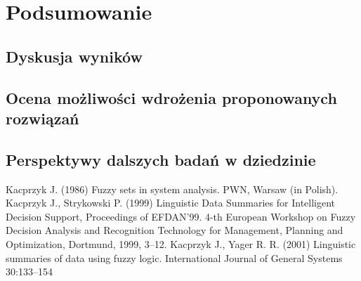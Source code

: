 \chapter{Podsumowanie}
\section{Dyskusja wyników}
\section{Ocena możliwości wdrożenia proponowanych rozwiązań}
\section{Perspektywy dalszych badań w dziedzinie}

\begin{thebibliography}{99}
Kacprzyk J. (1986) Fuzzy sets in system analysis.  PWN, Warsaw (in Polish).
Kacprzyk J., Strykowski P. (1999) Linguistic Data Summaries for Intelligent Decision Support, Proceedings of EFDAN'99. 4-th European Workshop on Fuzzy Decision Analysis and Recognition Technology for Management, Planning and Optimization, Dortmund, 1999, 3--12.
Kacprzyk J., Yager R. R. (2001) Linguistic summaries of data using fuzzy logic. International Journal of General Systems 30:133--154 

\end{thebibliography}

\listoffigures

\listoftables

